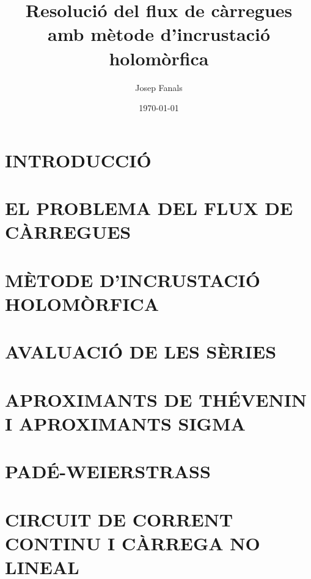 \documentclass[11pt, a4paper]{report} %
\title{Resolució del flux de càrregues amb mètode d'incrustació holomòrfica}
\author{Josep Fanals}
\date{\today}
\newcommand{\·}{\hspace{-1pt}·\hspace{-1pt}}
\begin{document}

\topskip=2pt

\tableofcontents
{}

\setlength\parskip{1.5em plus 0.1em minus 0.1em} %

\topskip=11pt

\def\arraystretch{1.25} %

\chapter{INTRODUCCIÓ}


\chapter{EL PROBLEMA DEL FLUX DE CÀRREGUES}


\chapter{MÈTODE D'INCRUSTACIÓ HOLOMÒRFICA}


\chapter{AVALUACIÓ DE LES SÈRIES}
  

\chapter{APROXIMANTS DE THÉVENIN I APROXIMANTS SIGMA}


\chapter{PADÉ-WEIERSTRASS}


\chapter{CIRCUIT DE CORRENT CONTINU I CÀRREGA NO LINEAL}

\end{document}
